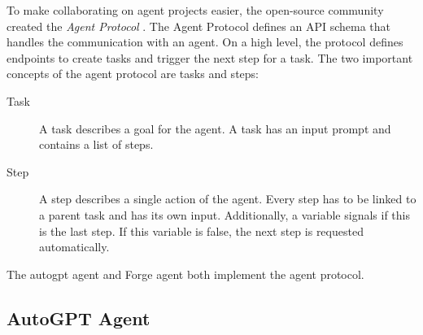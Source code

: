 \documentclass[../main.tex]{subfiles}
\begin{document}
To make collaborating on agent projects easier,
the open-source community created the \emph{Agent Protocol} \cite{zotero-111}.
The Agent Protocol defines an API schema
that handles the communication with an agent.
On a high level,
the protocol defines endpoints to create tasks and trigger the next step for a task.
The two important concepts of the agent protocol are tasks and steps:

\begin{description}
      \item[Task] A task describes a goal for the agent.
            A task has an input prompt and contains a list of steps.
      \item[Step] A step describes a single action of the agent.
            Every step has to be linked to a parent task and has its own input.
            Additionally, a variable signals if this is the last step.
            If this variable is false,
            the next step is requested automatically.
\end{description}
The \gls{autogpt} agent and Forge agent both implement the agent protocol.

\subsection{AutoGPT Agent}
\label{subsec:autogpt_agent}
\end{document}
